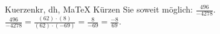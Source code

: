 \begin{MAufgabe}{Kuerzen}{kr, dh, MaTeX}
K\"urzen Sie soweit m\"oglich: $\frac{496}{-4278}$.\\ 
\ifLsg\MLoesung
\quad $\frac{496}{-4278}=\frac{(62)\cdot(8)}{(62)\cdot(-69)}=\frac{8}{-69}=\frac{-8}{69}$.\else\relax\fi
 \end{MAufgabe}